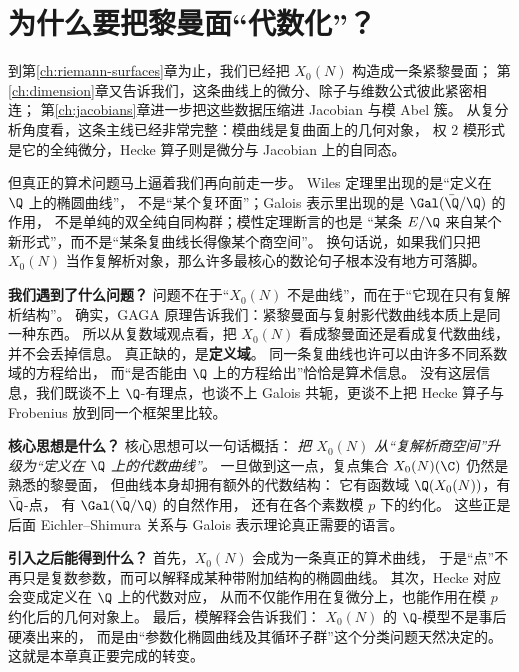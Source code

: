 \section{为什么要把黎曼面“代数化”？}
\label{sec:ch07-motivation}

到第\ref{ch:riemann-surfaces}章为止，我们已经把 $X_0(N)$ 构造成一条紧黎曼面；
第\ref{ch:dimension}章又告诉我们，这条曲线上的微分、除子与维数公式彼此紧密相连；
第\ref{ch:jacobians}章进一步把这些数据压缩进 Jacobian 与模 Abel 簇。
从复分析角度看，这条主线已经非常完整：模曲线是复曲面上的几何对象，
权 $2$ 模形式是它的全纯微分，Hecke 算子则是微分与 Jacobian 上的自同态。

但真正的算术问题马上逼着我们再向前走一步。
Wiles 定理里出现的是“定义在 $\Q$ 上的椭圆曲线”，
不是“某个复环面”；Galois 表示里出现的是 $\Gal(\bar\Q/\Q)$ 的作用，
不是单纯的双全纯自同构群；模性定理断言的也是
“某条 $E/\Q$ 来自某个新形式”，而不是“某条复曲线长得像某个商空间”。
换句话说，如果我们只把 $X_0(N)$ 当作复解析对象，那么许多最核心的数论句子根本没有地方可落脚。

\textbf{我们遇到了什么问题？}
问题不在于“$X_0(N)$ 不是曲线”，而在于“它现在只有复解析结构”。
确实，GAGA 原理告诉我们：紧黎曼面与复射影代数曲线本质上是同一种东西。
所以从复数域观点看，把 $X_0(N)$ 看成黎曼面还是看成复代数曲线，并不会丢掉信息。
真正缺的，是\textbf{定义域}。
同一条复曲线也许可以由许多不同系数域的方程给出，
而“是否能由 $\Q$ 上的方程给出”恰恰是算术信息。
没有这层信息，我们既谈不上 $\Q$-有理点，也谈不上 Galois 共轭，更谈不上把 Hecke 算子与 Frobenius 放到同一个框架里比较。

\textbf{核心思想是什么？}
核心思想可以一句话概括：
\emph{把 $X_0(N)$ 从“复解析商空间”升级为“定义在 $\Q$ 上的代数曲线”。}
一旦做到这一点，复点集合 $X_0(N)(\C)$ 仍然是熟悉的黎曼面，
但曲线本身却拥有额外的代数结构：
它有函数域 $\Q(X_0(N))$，有 $\bar\Q$-点，
有 $\Gal(\bar\Q/\Q)$ 的自然作用，
还有在各个素数模 $p$ 下的约化。
这些正是后面 Eichler--Shimura 关系与 Galois 表示理论真正需要的语言。

\textbf{引入之后能得到什么？}
首先，$X_0(N)$ 会成为一条真正的算术曲线，
于是“点”不再只是复数参数，而可以解释成某种带附加结构的椭圆曲线。
其次，Hecke 对应会变成定义在 $\Q$ 上的代数对应，
从而不仅能作用在复微分上，也能作用在模 $p$ 约化后的几何对象上。
最后，模解释会告诉我们：
$X_0(N)$ 的 $\Q$-模型不是事后硬凑出来的，
而是由“参数化椭圆曲线及其循环子群”这个分类问题天然决定的。
这就是本章真正要完成的转变。



